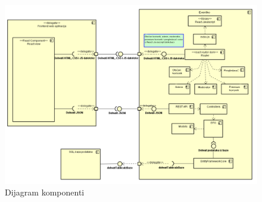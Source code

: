 				\begin{figure}[H]
					\includegraphics[width=\columnwidth]{slike/Komponente.png}
					\caption{Dijagram komponenti}
				\end{figure}
		 	
		 		
			 	